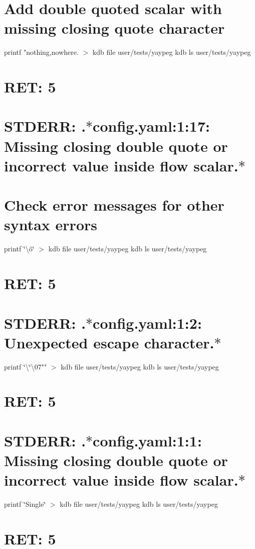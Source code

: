\section*{Add double quoted scalar with missing closing quote character}

printf \textquotesingle{}"nothing,nowhere.\textquotesingle{} $>$ {\ttfamily kdb file user/tests/yaypeg} kdb ls user/tests/yaypeg \section*{R\+ET\+: 5}

\section*{S\+T\+D\+E\+RR\+: .$\ast$config.yaml\+:1\+:17\+: Missing closing double quote or incorrect value inside flow scalar.$\ast$}

\section*{Check error messages for other syntax errors}

printf \textquotesingle{}\char`\"{}\textbackslash{}ö\char`\"{}\textquotesingle{} $>$ {\ttfamily kdb file user/tests/yaypeg} kdb ls user/tests/yaypeg \section*{R\+ET\+: 5}

\section*{S\+T\+D\+E\+RR\+: .$\ast$config.yaml\+:1\+:2\+: Unexpected escape character.$\ast$}

printf \char`\"{}\textbackslash{}\char`\"{}\textbackslash{}07"" $>$ {\ttfamily kdb file user/tests/yaypeg} kdb ls user/tests/yaypeg \section*{R\+ET\+: 5}

\section*{S\+T\+D\+E\+RR\+: .$\ast$config.yaml\+:1\+:1\+: Missing closing double quote or incorrect value inside flow scalar.$\ast$}

printf \char`\"{}\textquotesingle{}\+Single\char`\"{} $>$ {\ttfamily kdb file user/tests/yaypeg} kdb ls user/tests/yaypeg \section*{R\+ET\+: 5}

